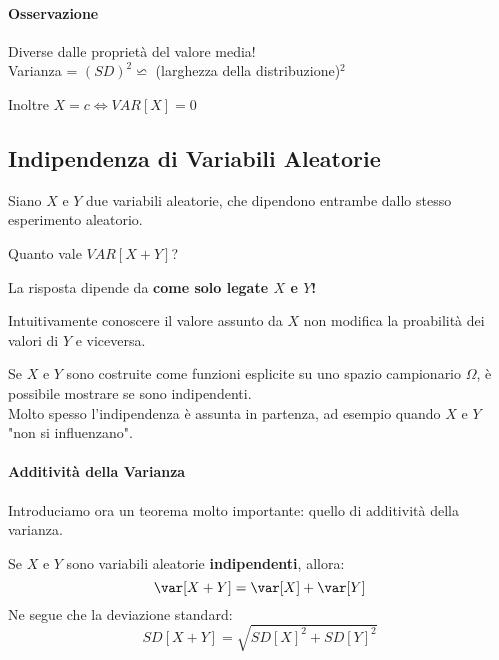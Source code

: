 \paragraph{Osservazione} Diverse dalle proprietà del valore media!
\\ Varianza = $(SD)^2 \backsimeq $ (larghezza della distribuzione)$^2$
\begin{center}
	Inoltre $X = c \Leftrightarrow VAR[X] = 0$
\end{center}


\subsection{Indipendenza di Variabili Aleatorie}
Siano $X$ e $Y$ due variabili aleatorie, che dipendono entrambe dallo
stesso esperimento aleatorio.
\begin{center}
	Quanto vale $VAR[X+Y]$?
\end{center}
La risposta dipende da \textbf{come solo legate $X$ e $Y$!}

Intuitivamente conoscere il valore assunto da $X$ non modifica la proabilità dei valori
di $Y$ e viceversa.

Se $X$ e $Y$ sono costruite come funzioni esplicite su uno spazio campionario $\Omega$,
è possibile mostrare se sono indipendenti.
\\ Molto spesso l'indipendenza è assunta in partenza, ad esempio quando $X$ e $Y$ "non si influenzano".

\paragraph{Additività della Varianza}
Introduciamo ora un teorema molto importante: quello di additività della varianza.

Se $X$ e $Y$ sono variabili aleatorie \textbf{indipendenti}, allora:
\[
	\var[X+Y] = \var[X] + \var[Y]
\]
Ne segue che la deviazione standard:
\[
	SD[X+Y] = \sqrt{SD[X]^2 + SD[Y]^2}
\]


